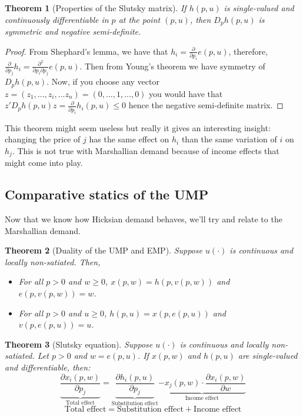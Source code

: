 \documentclass[12pt]{report}
\newtheorem{theorem}{Theorem}[chapter]
\begin{document}
\begin{theorem}[Properties of the Slutsky matrix]
If $h(p,u)$ is single-valued and continuously differentiable in $p$ at the point $(p,u)$, then $D_ph(p,u)$ is symmetric and negative semi-definite.
\end{theorem}
\begin{proof}
From Shephard's lemma, we have that $h_i = \frac{\partial}{\partial p_i}e(p,u)$, therefore, $\frac{\partial}{\partial p_j}h_i = \frac{\partial^2}{\partial p_i\partial p_j}e(p,u)$. Then from Young's theorem we have symmetry of $D_ph(p,u)$. Now, if you choose any vector $z = (z_1, ..., z_i, ... z_n) = (0, ..., 1, ..., 0)$ you would have that $z'D_ph(p,u)z = \frac{\partial}{\partial p_i}h_i(p,u) \leq 0$ hence the negative semi-definite matrix. 
\end{proof}

This theorem might seem useless but really it gives an interesting insight: changing the price of $j$ has the same effect on $h_i$ than the same variation of $i$ on $h_j$. This is not true with Marshallian demand because of income effects that might come into play.

\subsection{Comparative statics of the UMP}

Now that we know how Hicksian demand behaves, we'll try and relate to the Marshallian demand.

\begin{theorem}[Duality of the UMP and EMP]
Suppose $u(\cdot)$ is continuous and locally non-satiated. Then,\begin{itemize}
\item For all $p>0$ and $w\geq 0$, $x(p,w) = h(p, v(p,w))$ and $e(p,v(p,w)) = w$.
\item For all $p>0$ and $u\geq 0$, $h(p,u) = x(p, e(p,u))$ and $v(p,e(p,u)) = u$.
\end{itemize}
\end{theorem}

\begin{theorem}[Slutsky equation]
Suppose $u(\cdot)$ is continuous and locally non-satiated. Let $p>0$ and $w = e(p,u)$. If $x(p,w)$ and $h(p,u)$ are single-valued and differentiable, then: $$\underbrace{\frac{\partial x_i(p,w)}{\partial p_j}}_{\text{Total effect}} = \underbrace{\frac{\partial h_i(p,u)}{\partial p_j}}_{\text{Substitution effect}}  \underbrace{- x_j(p,w)\cdot\frac{\partial x_i(p,w)}{\partial w}}_{\text{Income effect}} $$ $$ \text{Total effect} = \text{Substitution effect} + \text{Income effect} $$
\end{theorem}
\end{document}
